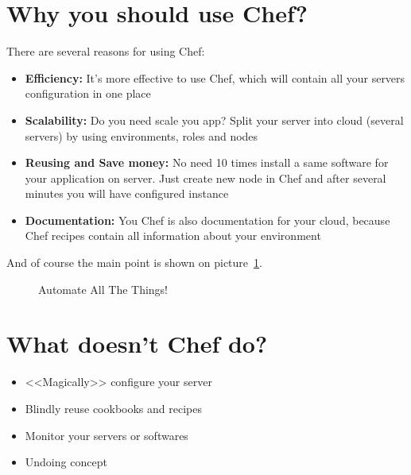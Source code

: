 \section{Why you should use Chef?}
\label{sec:what-benefits}

There are several reasons for using Chef:

\begin{itemize}
  \item \textbf{Efficiency:} It's more effective to use Chef, which will contain all your servers configuration in one place
  \item \textbf{Scalability:} Do you need scale you app? Split your server into cloud (several servers) by using environments, roles and nodes
  \item \textbf{Reusing and Save money:} No need 10 times install a same software for your application on server. Just create new node in Chef and after several minutes you will have configured instance
  \item \textbf{Documentation:} You Chef is also documentation for your cloud, because Chef recipes contain all information about your environment
\end{itemize}

And of course the main point is shown on picture~\ref{fig:automate-all-the-things}.

\begin{figure}[ht!]
  \caption{Automate All The Things!}
  \label{fig:automate-all-the-things}
\end{figure}


\section{What doesn't Chef do?}

\begin{itemize}
  \item <<Magically>> configure your server
  \item Blindly reuse cookbooks and recipes
  \item Monitor your servers or softwares
  \item Undoing concept
\end{itemize}
